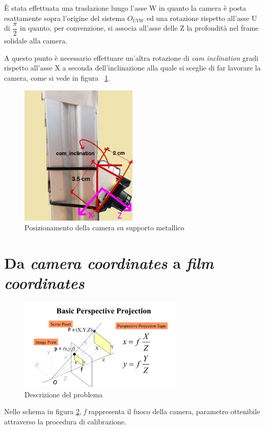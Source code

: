 È stata effettuata una traslazione lungo l'asse W in quanto la camera è posta esattamente sopra l'origine del sistema $O_{UVW}$ ed una rotazione rispetto all'asse U di $ \dfrac{\pi}{2}$ in quanto, per convenzione, si associa all'asse delle Z la profondità nel frame solidale alla camera.

A questo punto è necessario effettuare un'altra rotazione di \textit{cam inclination} gradi rispetto all'asse X a seconda dell'inclinazione alla quale si sceglie di far lavorare la camera, come si vede in figura ~\ref{fig:cameraSupport}.

\begin{figure}
	\centering
	\includegraphics[width=0.5\textwidth]{Immagini/CameraSupport_2.jpg}
	\caption{Posizionamento della camera su supporto metallico}
	\label{fig:cameraSupport}
\end{figure}

\section{Da \textit{camera coordinates} a \textit{film coordinates}}
\begin{figure}[H]
	\centering
	\includegraphics[width=0.7\textwidth]{Immagini/perspective_projection.png}
	\caption{Descrizione del problema}
	\label{fig:perspective_projection}
\end{figure}
Nello schema in figura \ref{fig:perspective_projection}, \textit{f} rappresenta il fuoco della camera, parametro ottenibile attraverso la procedura di calibrazione.

